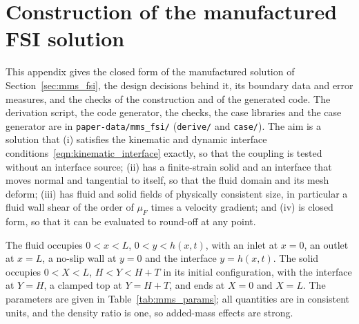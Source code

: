 \section{Construction of the manufactured FSI solution}
\label{app:mms}

This appendix gives the closed form of the manufactured solution of Section~\ref{sec:mms_fsi}, the design decisions behind it, its boundary data and error measures, and the checks of the construction and of the generated code.
The derivation script, the code generator, the checks, the case libraries and the case generator are in \texttt{paper-data/mms\_fsi/} (\texttt{derive/} and \texttt{case/}).
The aim is a solution that (i) satisfies the kinematic and dynamic interface conditions~\eqref{eqn:kinematic_interface} exactly, so that the coupling is tested without an interface source; (ii) has a finite-strain solid and an interface that moves normal and tangential to itself, so that the fluid domain and its mesh deform; (iii) has fluid and solid fields of physically consistent size, in particular a fluid wall shear of the order of $\mu_F$ times a velocity gradient; and (iv) is closed form, so that it can be evaluated to round-off at any point.

The fluid occupies $0 < x < L$, $0 < y < h(x,t)$, with an inlet at $x = 0$, an outlet at $x = L$, a no-slip wall at $y = 0$ and the interface $y = h(x,t)$.
The solid occupies $0 < X < L$, $H < Y < H + T$ in its initial configuration, with the interface at $Y = H$, a clamped top at $Y = H + T$, and ends at $X = 0$ and $X = L$.
The parameters are given in Table~\ref{tab:mms_params}; all quantities are in consistent units, and the density ratio is one, so added-mass effects are strong.

